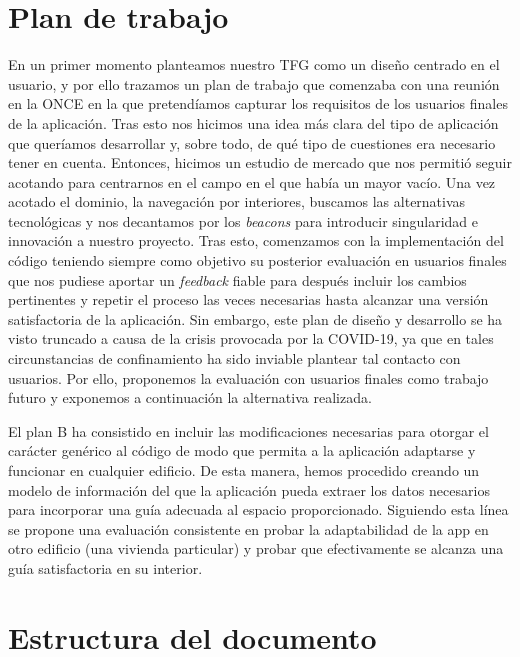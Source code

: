 \section{Plan de trabajo}
\label{sec:planTrabajo}

En un primer momento planteamos nuestro TFG como un diseño centrado en el usuario, y por ello trazamos un plan de trabajo que comenzaba con una reunión en la ONCE en la que pretendíamos capturar los requisitos de los usuarios finales de la aplicación. Tras esto nos hicimos una idea más clara del tipo de aplicación que queríamos desarrollar y, sobre todo, de qué tipo de cuestiones era necesario tener en cuenta. Entonces, hicimos un estudio de mercado que nos permitió seguir acotando para centrarnos en el campo en el que había un mayor vacío. Una vez acotado el dominio, la navegación por interiores, buscamos las alternativas tecnológicas y nos decantamos por los \textit{beacons} para introducir singularidad e innovación a nuestro proyecto. Tras esto, comenzamos con la implementación del código teniendo siempre como objetivo su posterior evaluación en usuarios finales que nos pudiese aportar un \textit{feedback} fiable para después incluir los cambios pertinentes y repetir el proceso las veces necesarias hasta alcanzar una versión satisfactoria de la aplicación. Sin embargo, este plan de diseño y desarrollo se ha visto truncado a causa de la crisis provocada por la COVID-19, ya que en tales circunstancias de confinamiento ha sido inviable plantear tal contacto con usuarios. Por ello, proponemos la evaluación con usuarios finales como trabajo futuro y exponemos a continuación la alternativa realizada.

El plan B ha consistido en incluir las modificaciones necesarias para otorgar el carácter genérico al código de modo que permita a la aplicación adaptarse y funcionar en cualquier edificio. De esta manera, hemos procedido creando un modelo de información del que la aplicación pueda extraer los datos necesarios para incorporar una guía adecuada al espacio proporcionado. Siguiendo esta línea se propone una evaluación consistente en probar la adaptabilidad de la app en otro edificio (una vivienda particular) y probar que efectivamente se alcanza una guía satisfactoria en su interior.



\section{Estructura del documento}

